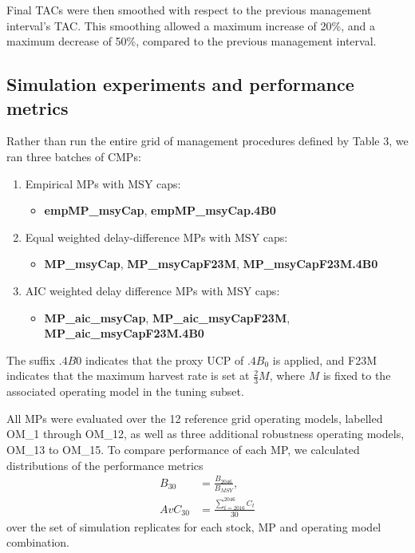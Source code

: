\documentclass[]{article}
\providecommand{\tightlist}{%
  \setlength{\itemsep}{0pt}\setlength{\parskip}{0pt}}
\begin{document}
Final TACs were then smoothed with respect to the previous management
interval's TAC. This smoothing allowed a maximum increase of 20\%, and
a maximum decrease of 50\%, compared to the previous management interval.

\hypertarget{simulation-experiments-and-performance-metrics}{%
\subsection{Simulation experiments and performance metrics}\label{simulation-experiments-and-performance-metrics}}

Rather than run the entire grid of management procedures
defined by Table 3, we ran three batches of CMPs:

\begin{enumerate}
\def\labelenumi{\arabic{enumi}.}
\tightlist
\item
  Empirical MPs with MSY caps:

  \begin{itemize}
  \tightlist
  \item
    \textbf{empMP\_msyCap}, \textbf{empMP\_msyCap.4B0}
  \end{itemize}
\item
  Equal weighted delay-difference MPs with MSY caps:

  \begin{itemize}
  \tightlist
  \item
    \textbf{MP\_msyCap}, \textbf{MP\_msyCapF23M}, \textbf{MP\_msyCapF23M.4B0}
  \end{itemize}
\item
  AIC weighted delay difference MPs with MSY caps:

  \begin{itemize}
  \tightlist
  \item
    \textbf{MP\_aic\_msyCap}, \textbf{MP\_aic\_msyCapF23M}, \textbf{MP\_aic\_msyCapF23M.4B0}
  \end{itemize}
\end{enumerate}

The suffix \(.4B0\) indicates that the proxy UCP of \(.4B_0\) is
applied, and F23M indicates that the maximum harvest rate
is set at \(\frac{2}{3}M\), where \(M\) is fixed to the associated
operating model in the tuning subset.

All MPs were evaluated over the 12 reference grid operating
models, labelled OM\_1 through OM\_12, as well as three
additional robustness operating models, OM\_13 to OM\_15.
To compare performance of each MP, we calculated distributions
of the performance metrics
\begin{align}
B_{30} &= \frac{B_{2046}}{B_{MSY}}, \\
AvC_{30} &= \frac{\sum_{t = 2016}^{2046} C_t}{30}
\end{align}
over the set of simulation replicates for each stock, MP and
operating model combination.
\end{document}
